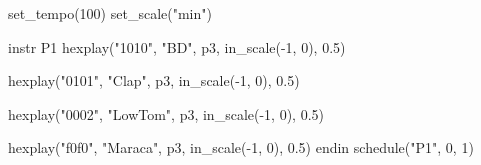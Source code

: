 set_tempo(100)
set_scale("min")

instr P1 
  hexplay("1010", 
      "BD", p3,
      in_scale(-1, 0),
      0.5)
  
  hexplay("0101", 
      "Clap", p3,
      in_scale(-1, 0),
      0.5)
  
  hexplay("0002", 
      "LowTom", p3,
      in_scale(-1, 0),
      0.5)
  
  hexplay("f0f0", 
      "Maraca", p3,
      in_scale(-1, 0),
      0.5)
endin
schedule("P1", 0, 1)
